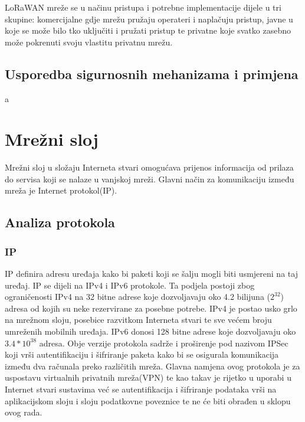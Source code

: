 \documentclass[times, utf8, diplomski]{fer}
\begin{document}
LoRaWAN mreže se u načinu pristupa i potrebne implementacije dijele u tri skupine: komercijalne gdje mrežu pružaju operateri i naplačuju pristup, javne u koje se može bilo tko uključiti i pružati pristup te privatne koje svatko zasebno može pokrenuti svoju vlastitu privatnu mrežu.

\subsection{Usporedba sigurnosnih mehanizama i primjena}
a

\section{Mrežni sloj}
Mrežni sloj u složaju Interneta stvari omogućava prijenos informacija od prilaza do servisa koji se nalaze u vanjskoj mreži. Glavni način za komunikaciju između mreža je Internet protokol(IP). 

\subsection{Analiza protokola}
\subsubsection{IP}
IP definira adresu uređaja kako bi paketi koji se šalju mogli biti usmjereni na taj uređaj. IP se dijeli na IPv4 i IPv6 protokole. Ta podjela postoji zbog ograničenosti IPv4 na 32 bitne adrese koje dozvoljavaju oko 4.2 bilijuna ($2^{32}$) adresa od kojih su neke rezervirane za posebne potrebe. IPv4 je postao usko grlo na mrežnom sloju, posebice razvitkom Interneta stvari te sve većem broju umreženih mobilnih uređaja. IPv6 donosi 128 bitne adrese koje dozvoljavaju oko $3.4*10^{38}$ adresa. Obje verzije protokola sadrže i proširenje pod nazivom IPSec  koji vrši autentifikaciju i šifriranje paketa kako bi se osigurala komunikacija između dva računala preko različitih mreža. Glavna namjena ovog protokola je za uspostavu virtualnih privatnih mreža(VPN) te kao takav je rijetko u uporabi u Internet stvari sustavima već se autentifikacija i šifriranje podataka vrši na aplikacijskom sloju i sloju podatkovne poveznice te ne će biti obrađen u sklopu ovog rada. 
\end{document}
